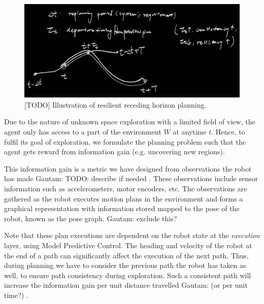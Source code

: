 \documentclass[letterpaper]{article} %
\newcommand{\ncomment}[1]{}
\newcommand{\gautam}[1]{{\color{cyan}Gautam: #1 }}
\begin{document}
\begin{figure}[t!]
  \centering
  \includegraphics[width=\columnwidth]{figures/sketch_receding_horizon_planning.jpg}
  \caption{[TODO] Illustration of resilient receding horizon planning.}
  \label{fig:receding-horizon-planning}
\end{figure}



Due to the nature of unknown space exploration with a limited field of view, the agent \ncomment{decision making} only has access to a part of the environment $W$ at anytime $t$. Hence, to fulfil its goal of exploration, we formulate the planning problem such that the agent gets reward from information gain (e.g. uncovering new regions).

This information gain is a metric we have designed \ncomment{learned?} from observations the robot has made \gautam{TODO: describe if needed}. These observations include sensor information such as accelerometers, motor encoders, \ncomment{images?} etc. The observations are gathered as the robot executes motion plans in the environment and forms a graphical representation with information stored mapped to the pose of the robot, known as the pose graph. \gautam{exclude this?}

Note that these plan executions are dependent on the robot state at the \textit{execution} layer, using Model Predictive Control. The heading and velocity of the robot at the end of a path can significantly affect the execution of the next path. Thus, during planning we have to consider the previous path the robot has taken as well, to ensure path consistency during exploration. Such a consistent path will increase the information gain per unit distance travelled \gautam{(or per unit time?)}.
\end{document}
